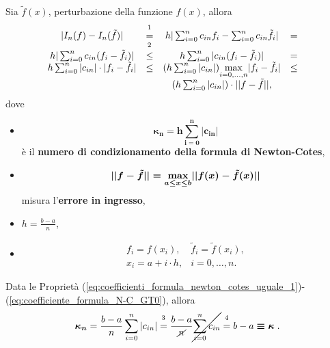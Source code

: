 \begin{definition}
	Sia $\tilde{f}(x)$, perturbazione della funzione $f(x)$, allora
	\begin{equation*}
	    \begin{matrix}
		        |I_n(f)-I_n(\Tilde{f})|&\overset{\footnotemark}{=}&h|\sum_{i=0}^n c_{in}f_i-\sum_{i=0}^n c_{in}\Tilde{f_i}|&=&\\
		        h|\sum_{i=0}^n c_{in}(f_i-\Tilde{f_i})|&\overset{\footnotemark}{\leq}&h\sum_{i=0}^n |c_{in}(f_i-\Tilde{f_i})|&=&\\
		        h\sum_{i=0}^n |c_{in}|\cdot|f_i-\Tilde{f_i}|&\leq&(h\sum_{i=0}^n|c_{in}|)\underset{i=0,\hdots,n}{\max}|f_i-\Tilde{f_i}|&\leq&\\
		        &&(h\sum_{i=0}^n|c_{in}|)\cdot ||f-\Tilde{f}||,
	    \end{matrix}
	\end{equation*}
	dove
	\begin{itemize}
		\item \begin{equation}\label{eq:numero_condizionamento_newton_cotes}
			\boldsymbol{\kappa_n = h\sum_{i=0}^n|c_{in}|}
		\end{equation}
		è il \textbf{numero di condizionamento della formula di Newton-Cotes},
		\item \begin{equation*}
			\boldsymbol{||f-\Tilde{f}|| = \underset{a\leq x\leq b}{\max}||f(x)-\Tilde{f}(x)||}
		\end{equation*}
		misura l'\textbf{errore in ingresso},
		\item $h=\frac{b-a}{n}$,
		\item
		\begin{equation*}
			\begin{matrix}
				f_i = f(x_i), & \tilde{f}_i = \tilde{f}(x_i),\\ x_i = a + i\cdot h, &i = 0,\hdots, n.
			\end{matrix}
		\end{equation*}
	\end{itemize}
\end{definition}
\addtocounter{footnote}{-1}


\begin{remark}\label{rem:uguaglianza_numero_condizionamento_newton_cotes}
    Data le Proprietà (\ref{eq:coefficienti_formula_newton_cotes_uguale_1})-(\ref{eq:coefficiente_formula_N-C_GT0}), allora
    \begin{equation}\label{eq:numero_condizionamento_N-C_uguaglianza}
     \boldsymbol{\kappa_n}=\frac{b-a}{n}\sum_{i=0}^n|c_{in}|\overset{\footnotemark}{=}\frac{b-a}{\cancel{n}}\cancel{\sum_{i=0}^nc_{in}}\overset{\footnotemark}{=}b-a\boldsymbol{\equiv\kappa}.
    \end{equation}
\end{remark}
\addtocounter{footnote}{-1}

